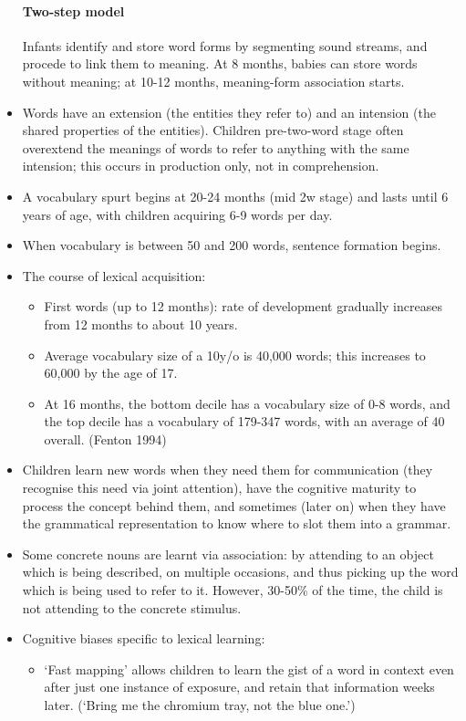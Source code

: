 \documentclass{article}
\begin{document}
\begin{itemize}
    \paragraph{Two-step model} Infants identify and store word forms by segmenting sound streams, and procede to link them to meaning. At 8 months, babies can store words without meaning; at 10-12 months, meaning-form association starts.
    \item Words have an extension (the entities they refer to) and an intension (the shared properties of the entities). Children pre-two-word stage often overextend the meanings of words to refer to anything with the same intension; this occurs in production only, not in comprehension.
    \item A vocabulary spurt begins at 20-24 months (mid 2w stage) and lasts until 6 years of age, with children acquiring 6-9 words per day.
    \item When vocabulary is between 50 and 200 words, sentence formation begins.
    \item The course of lexical acquisition:
    \begin{itemize}
        \item First words (up to 12 months): rate of development gradually increases from 12 months to about 10 years.
        \item Average vocabulary size of a 10y/o is 40,000 words; this increases to 60,000 by the age of 17.
        \item At 16 months, the bottom decile has a vocabulary size of 0-8 words, and the top decile has a vocabulary of 179-347 words, with an average of 40 overall. (Fenton 1994)
    \end{itemize}
    \item Children learn new words when they need them for communication (they recognise this need via joint attention), have the cognitive maturity to process the concept behind them, and sometimes (later on) when they have the grammatical representation to know where to slot them into a grammar.
    \item Some concrete nouns are learnt via association: by attending to an object which is being described, on multiple occasions, and thus picking up the word which is being used to refer to it. However, 30-50\% of the time, the child is not attending to the concrete stimulus.
    \item Cognitive biases specific to lexical learning:
    \begin{itemize}
        \item `Fast mapping' allows children to learn the gist of a word in context even after just one instance of exposure, and retain that information weeks later. (`Bring me the chromium tray, not the blue one.')

\end{itemize}
\end{itemize}
\end{document}
